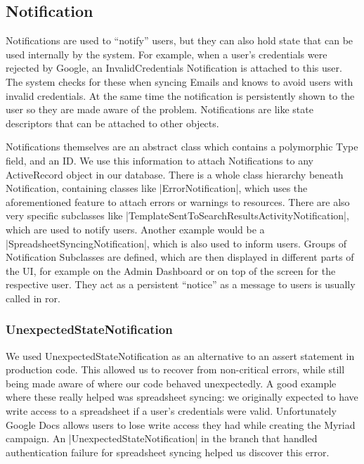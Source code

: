 \subsection{Notification}

Notifications are used to ``notify'' users, but they can also hold state that can be used internally by the system. For example, when a user's credentials were rejected by Google, an InvalidCredentials Notification is attached to this user. The system checks for these when syncing Emails and knows to avoid users with invalid credentials. At the same time the notification is persistently shown to the user so they are made aware of the problem. Notifications are like state descriptors that can be attached to other objects.

Notifications themselves are an abstract class which contains a polymorphic Type field, and an ID. We use this information to attach Notifications to any ActiveRecord object in our database. There is a whole class hierarchy beneath Notification, containing classes like |ErrorNotification|, which uses the aforementioned feature to attach errors or warnings to resources. There are also very specific subclasses like |TemplateSentToSearchResultsActivityNotification|, which are used to notify users. Another example would be a |SpreadsheetSyncingNotification|, which is also used to inform users. Groups of Notification Subclasses are defined, which are then displayed in different parts of the UI, for example on the Admin Dashboard or on top of the screen for the respective user. They act as a persistent ``notice'' as a message to users is usually called in \gls{ror}.

\subsubsection{UnexpectedStateNotification}

We used UnexpectedStateNotification as an alternative to an assert statement in production code. This allowed us to recover from non-critical errors, while still being made aware of where our code behaved unexpectedly. A good example where these really helped was spreadsheet syncing: we originally expected to have write access to a spreadsheet if a user's credentials were valid. Unfortunately Google Docs allows users to lose write access they had while creating the Myriad campaign. An |UnexpectedStateNotification| in the branch that handled authentication failure for spreadsheet syncing helped us discover this error.

